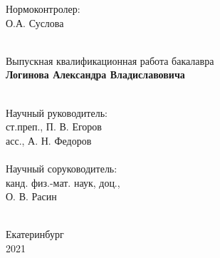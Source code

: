 \begin{titlepage}
\begin{centering}
\begin{minipage}[t]{.50\textwidth}
Нормоконтролер: \\
О.А. Суслова\\
\bigskip
\underline{\hspace{5.5cm}}\\
\end{minipage}%
%
\begin{minipage}[t]{.50\textwidth}
\begin{centering}
Выпускная квалификационная
работа бакалавра\\
\textbf{Логинова Александра Владиславовича}\\
\bigskip
\underline{\hspace{5.5cm}}\\
\bigskip\bigskip

Научный руководитель: \\
ст.преп., П. В. Егоров
\underline{\hspace{5.5cm}}\\
\bigskip
асс., А. Н. Федоров\\
\underline{\hspace{5.5cm}}\\
\bigskip
Научный соруководитель: \\
канд. физ.-мат. наук, доц.,\\ О. В. Расин\\
\underline{\hspace{5.5cm}}\\
\bigskip
\end{centering}
\end{minipage}

\vfill

{Екатеринбург\\2021}

\end{centering}
\end{titlepage}

